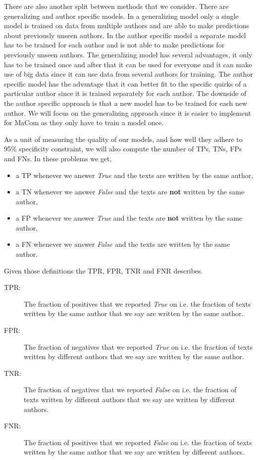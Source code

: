 There are also another split between methods that we consider. There are
generalizing and author specific models. In a generalizing model only a single
model is trained on data from multiple authors and are able to make predictions
about previously unseen authors. In the author specific model a separate model
has to be trained for each author and is not able to make predictions for
previously unseen authors. The generalizing model has several advantages, it
only has to be trained once and after that it can be used for everyone and
it can make use of big data since it can use data from several authors for
training. The author specific model has the advantage that it can better fit
to the specific quirks of a particular author since it is trained separately
for each author. The downside of the author specific approach is that a new
model has to be trained for each new author. We will focus on the generalizing
approach since it is easier to implement for MaCom as they only have to train a
model once.

As a unit of measuring the quality of our models, and how well they adhere to
95\% specificity constraint, we will also compute the number of \gls{TP}s,
\gls{TN}s, \gls{FP}s and \gls{FN}s. In these problems we get,

\begin{itemize}
    \item a \gls{TP} whenever we answer \textit{True} and the texts are written
        by the same author,
    \item a \gls{TN} whenever we answer \textit{False} and the texts are
        \textbf{not} written by the same author,
    \item a \gls{FP} whenever we answer \textit{True} and the texts are
        \textbf{not} written by the same author,
    \item a \gls{FN} whenever we answer \textit{False} and the texts are written
        by the same author.
\end{itemize}

Given those definitions the \gls{TPR}, \gls{FPR}, \gls{TNR} and \gls{FNR}
describes.

\begin{description}
    \item[\gls{TPR}: ] The fraction of positives that we reported \textit{True}
        on i.e. the fraction of texts written by the same author that we say are
        written by the same author.
    \item[\gls{FPR}: ] The fraction of negatives that we reported \textit{True}
        on i.e. the fraction of texts written by different authors that we say
        are written by the same author.
    \item[\gls{TNR}: ] The fraction of negatives that we reported \textit{False}
        on i.e. the fraction of texts written by different authors that we say
        are written by different authors.
    \item[\gls{FNR}: ] The fraction of positives that we reported \textit{False}
        on i.e. the fraction of texts written by the same author that we say are
        written by different authors.
\end{description}


